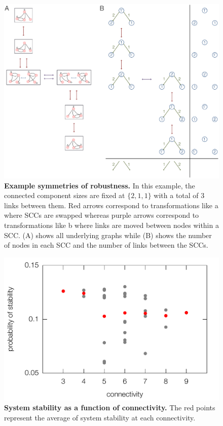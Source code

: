 
\begin{figure}[!ht]
\centering
\noindent\includegraphics[width=0.9\columnwidth]{fig/robustnesssymmetries.pdf}
\caption{{\bf Example symmetries of robustness.} In this example, the connected component sizes are fixed at $\{2,1,1\}$ with a total of $3$ links between them. Red arrows correspond to transformations like  a where SCCs are swapped whereas purple arrows correspond to transformations like  b where links are moved between nodes within a SCC. (A) shows all underlying graphs while (B) shows the number of nodes in each SCC and the number of links between the SCCs.}
\label{fig:robustnesssymmetries}
\end{figure}

\pagebreak

\begin{figure}[!ht]
\centering
\noindent\includegraphics[width=0.6\columnwidth]{fig/apstab3x3.pdf}
\caption{{\bf System stability as a function of connectivity.} The red points represent the average of system stability at each connectivity.}
\label{fig:apstab3x3}
\end{figure}

